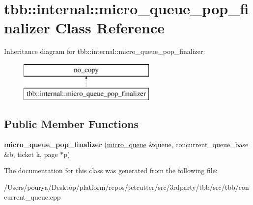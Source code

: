 \hypertarget{classtbb_1_1internal_1_1micro__queue__pop__finalizer}{}\section{tbb\+:\+:internal\+:\+:micro\+\_\+queue\+\_\+pop\+\_\+finalizer Class Reference}
\label{classtbb_1_1internal_1_1micro__queue__pop__finalizer}
Inheritance diagram for tbb\+:\+:internal\+:\+:micro\+\_\+queue\+\_\+pop\+\_\+finalizer\+:\begin{figure}[H]
\begin{center}
\leavevmode
\includegraphics[height=2.000000cm]{classtbb_1_1internal_1_1micro__queue__pop__finalizer}
\end{center}
\end{figure}
\subsection*{Public Member Functions}
\begin{DoxyCompactItemize}
\item 
\hypertarget{classtbb_1_1internal_1_1micro__queue__pop__finalizer_aa73c7115f3223283be32d1b43d5f551f}{}{\bfseries micro\+\_\+queue\+\_\+pop\+\_\+finalizer} (\hyperlink{structtbb_1_1internal_1_1micro__queue}{micro\+\_\+queue} \&queue, concurrent\+\_\+queue\+\_\+base \&b, ticket k, page $\ast$p)\label{classtbb_1_1internal_1_1micro__queue__pop__finalizer_aa73c7115f3223283be32d1b43d5f551f}

\end{DoxyCompactItemize}


The documentation for this class was generated from the following file\+:\begin{DoxyCompactItemize}
\item 
/\+Users/pourya/\+Desktop/platform/repos/tetcutter/src/3rdparty/tbb/src/tbb/concurrent\+\_\+queue.\+cpp\end{DoxyCompactItemize}
